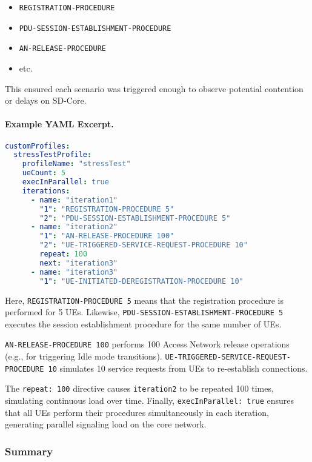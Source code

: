 \begin{itemize}
    \item \texttt{REGISTRATION-PROCEDURE}
    \item \texttt{PDU-SESSION-ESTABLISHMENT-PROCEDURE}
    \item \texttt{AN-RELEASE-PROCEDURE}
    \item etc.
\end{itemize}

This ensured each scenario was triggered enough to observe potential contention or delays on SD-Core.
\paragraph{Example YAML Excerpt.}
\begin{lstlisting}[language=yaml, caption={stressTestProfile for gNBsim}, label={lst:stress-profile}]
customProfiles:
  stressTestProfile:
    profileName: "stressTest"
    ueCount: 5
    execInParallel: true
    iterations:
      - name: "iteration1"
        "1": "REGISTRATION-PROCEDURE 5"
        "2": "PDU-SESSION-ESTABLISHMENT-PROCEDURE 5"
      - name: "iteration2"
        "1": "AN-RELEASE-PROCEDURE 100"
        "2": "UE-TRIGGERED-SERVICE-REQUEST-PROCEDURE 10"
        repeat: 100
        next: "iteration3"
      - name: "iteration3"
        "1": "UE-INITIATED-DEREGISTRATION-PROCEDURE 10"
\end{lstlisting}

Here, \texttt{REGISTRATION-PROCEDURE 5} means that the registration procedure is performed for 5 UEs.  
Likewise, \texttt{PDU-SESSION-ESTABLISHMENT-PROCEDURE 5} executes the session establishment procedure for the same number of UEs.

\texttt{AN-RELEASE-PROCEDURE 100} performs 100 Access Network release operations (e.g., for triggering Idle mode transitions).  
\texttt{UE-TRIGGERED-SERVICE-REQUEST-PROCEDURE 10} simulates 10 service requests from UEs to re-establish connections.

The \texttt{repeat: 100} directive causes \texttt{iteration2} to be repeated 100 times, simulating continuous load over time.  
Finally, \texttt{execInParallel: true} ensures that all UEs perform their procedures simultaneously in each iteration, generating parallel signaling load on the core network.



\subsubsection{Summary}

